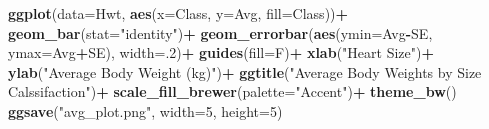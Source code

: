 \documentclass[
]{article}
\newenvironment{Shaded}{\begin{snugshade}}{\end{snugshade}}
\newcommand{\DataTypeTok}[1]{\textcolor[rgb]{0.13,0.29,0.53}{#1}}
\newcommand{\DecValTok}[1]{\textcolor[rgb]{0.00,0.00,0.81}{#1}}
\newcommand{\KeywordTok}[1]{\textcolor[rgb]{0.13,0.29,0.53}{\textbf{#1}}}
\newcommand{\NormalTok}[1]{#1}
\newcommand{\OperatorTok}[1]{\textcolor[rgb]{0.81,0.36,0.00}{\textbf{#1}}}
\newcommand{\StringTok}[1]{\textcolor[rgb]{0.31,0.60,0.02}{#1}}
\begin{document}
\begin{Shaded}
\begin{Highlighting}[]
\KeywordTok{ggplot}\NormalTok{(}\DataTypeTok{data=}\NormalTok{Hwt, }\KeywordTok{aes}\NormalTok{(}\DataTypeTok{x=}\NormalTok{Class, }\DataTypeTok{y=}\NormalTok{Avg, }\DataTypeTok{fill=}\NormalTok{Class))}\OperatorTok{+}
\StringTok{  }\KeywordTok{geom_bar}\NormalTok{(}\DataTypeTok{stat=}\StringTok{"identity"}\NormalTok{)}\OperatorTok{+}
\StringTok{  }\KeywordTok{geom_errorbar}\NormalTok{(}\KeywordTok{aes}\NormalTok{(}\DataTypeTok{ymin=}\NormalTok{Avg}\OperatorTok{-}\NormalTok{SE, }\DataTypeTok{ymax=}\NormalTok{Avg}\OperatorTok{+}\NormalTok{SE), }
                \DataTypeTok{width=}\NormalTok{.}\DecValTok{2}\NormalTok{)}\OperatorTok{+}
\StringTok{  }\KeywordTok{guides}\NormalTok{(}\DataTypeTok{fill=}\NormalTok{F)}\OperatorTok{+}
\StringTok{  }\KeywordTok{xlab}\NormalTok{(}\StringTok{"Heart Size"}\NormalTok{)}\OperatorTok{+}\StringTok{ }\KeywordTok{ylab}\NormalTok{(}\StringTok{"Average Body Weight (kg)"}\NormalTok{)}\OperatorTok{+}
\StringTok{  }\KeywordTok{ggtitle}\NormalTok{(}\StringTok{"Average Body Weights by Size Calssifaction"}\NormalTok{)}\OperatorTok{+}
\StringTok{  }\KeywordTok{scale_fill_brewer}\NormalTok{(}\DataTypeTok{palette=}\StringTok{"Accent"}\NormalTok{)}\OperatorTok{+}
\StringTok{  }\KeywordTok{theme_bw}\NormalTok{()}
\KeywordTok{ggsave}\NormalTok{(}\StringTok{"avg_plot.png"}\NormalTok{, }\DataTypeTok{width=}\DecValTok{5}\NormalTok{, }\DataTypeTok{height=}\DecValTok{5}\NormalTok{)}
\end{Highlighting}
\end{Shaded}
\end{document}
